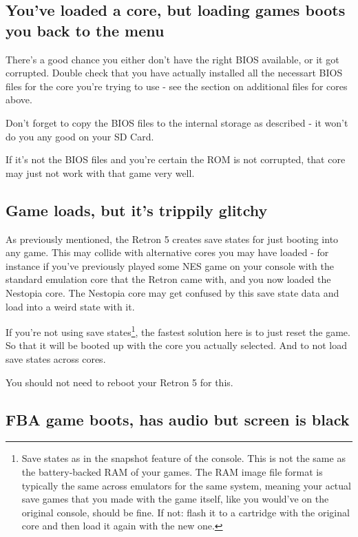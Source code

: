 \documentclass[english]{retronlabo-manual}
\begin{document}
\subsection{You've loaded a core, but loading games boots you back to the menu}

There's a good chance you either don't have the right BIOS available, or it got corrupted. Double check that you have actually installed all the necessart BIOS files for the core you're trying to use - see the section on additional files for cores above.

Don't forget to copy the BIOS files to the internal storage as described - it won't do you any good on your SD Card.

If it's not the BIOS files and you're certain the ROM is not corrupted, that core may just not work with that game very well.

\subsection{Game loads, but it's trippily glitchy}

As previously mentioned, the Retron 5 creates save states for just booting into any game. This may collide with alternative cores you may have loaded - for instance if you've previously played some NES game on your console with the standard emulation core that the Retron came with, and you now loaded the Nestopia core. The Nestopia core may get confused by this save state data and load into a weird state with it.

If you're not using save states\footnote{Save states as in the snapshot feature of the console. This is not the same as the battery-backed RAM of your games. The RAM image file format is typically the same across emulators for the same system, meaning your actual save games that you made with the game itself, like you would've on the original console, should be fine. If not: flash it to a cartridge with the original core and then load it again with the new one.}, the fastest solution here is to just reset the game. So that it will be booted up with the core you actually selected. And to not load save states across cores.

You should not need to reboot your Retron 5 for this.

\subsection{FBA game boots, has audio but screen is black}
\end{document}
